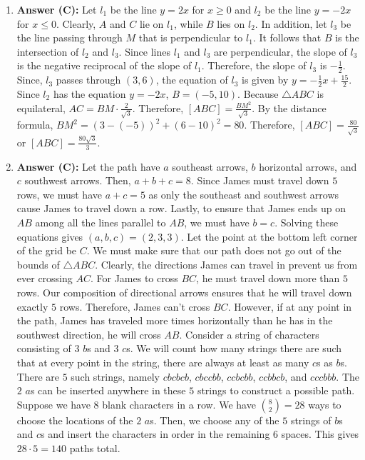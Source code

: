 \documentclass{article}
\begin{document}
\begin{enumerate}
\item \textbf{Answer (C):} Let $l_{1}$ be the line $y=2x$ for $x\ge0$ and $l_{2}$ be the line $y=-2x$ for $x\le0$. Clearly, $A$ and $C$ lie on $l_{1}$, while $B$ lies on $l_{2}$. In addition, let $l_{3}$ be the line passing through $M$ that is perpendicular to $l_{1}$. It follows that $B$ is the intersection of $l_{2}$ and $l_{3}$. Since lines $l_{1}$ and $l_{3}$ are perpendicular, the slope of $l_{3}$ is the negative reciprocal of the slope of $l_{1}$. Therefore, the slope of $l_{3}$ is $-\frac{1}{2}$. Since, $l_{3}$ passes through $(3,6)$, the equation of $l_{3}$ is given by $y=-\frac{1}{2}x+\frac{15}{2}$. Since $l_{2}$ has the equation $y=-2x$, $B=(-5,10)$. Because $\triangle ABC$ is equilateral, $AC=BM\cdot\frac{2}{\sqrt{3}}$. Therefore, $[ABC]=\frac{BM^{2}}{\sqrt{3}}$. By the distance formula, $BM^{2}=(3-(-5))^{2}+(6-10)^{2}=80$. Therefore, $[ABC]=\frac{80}{\sqrt{3}}$ or $[ABC]=\frac{80\sqrt{3}}{3}$.

\item \textbf{Answer (C):} Let the path have $a$ southeast arrows, $b$ horizontal arrows, and $c$ southwest arrows. Then, $a+b+c=8$. Since James must travel down $5$ rows, we must have $a+c=5$ as only the southeast and southwest arrows cause James to travel down a row. Lastly, to ensure that James ends up on $AB$ among all the lines parallel to $AB$, we must have $b=c$. Solving these equations gives $(a,b,c)=(2,3,3)$. Let the point at the bottom left corner of the grid be $C$. We must make sure that our path does not go out of the bounds of $\triangle ABC$. Clearly, the directions James can travel in prevent us from ever crossing $AC$. For James to cross $BC$, he must travel down more than $5$ rows. Our composition of directional arrows ensures that he will travel down exactly $5$ rows. Therefore, James can't cross $BC$. However, if at any point in the path, James has traveled more times horizontally than he has in the southwest direction, he will cross $AB$. Consider a string of characters consisting of $3$ $b$s and $3$ $c$s. We will count how many strings there are such that at every point in the string, there are always at least as many $c$s as $b$s. There are $5$ such strings, namely $cbcbcb$, $cbccbb$, $ccbcbb$, $ccbbcb$, and $cccbbb$. The $2$ $a$s can be inserted anywhere in these $5$ strings to construct a possible path. Suppose we have $8$ blank characters in a row. We have $\binom{8}{2}=28$ ways to choose the locations of the $2$ $a$s. Then, we choose any of the $5$ strings of $b$s and $c$s and insert the characters in order in the remaining $6$ spaces. This gives $28\cdot5=140$ paths total.


\end{enumerate}
\end{document}
